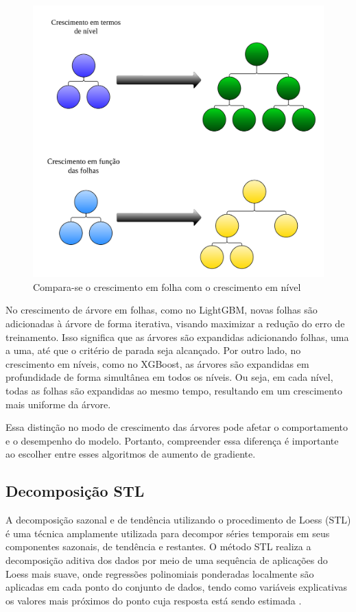 \begin{figure}[H]
	\centering
	\caption{Compara-se o crescimento em folha com o crescimento em nível}
	\label{fig:xgboost}
	\includegraphics[width=0.7\linewidth]{Modelos/Figuras/xgboost}
	
\end{figure}


No crescimento de árvore em folhas, como no LightGBM, novas folhas são adicionadas à árvore de forma iterativa, visando maximizar a redução do erro de treinamento. Isso significa que as árvores são expandidas adicionando folhas, uma a uma, até que o critério de parada seja alcançado.
Por outro lado, no crescimento em níveis, como no XGBoost, as árvores são expandidas em profundidade de forma simultânea em todos os níveis. Ou seja, em cada nível, todas as folhas são expandidas ao mesmo tempo, resultando em um crescimento mais uniforme da árvore.

Essa distinção no modo de crescimento das árvores pode afetar o comportamento e o desempenho do modelo. Portanto, compreender essa diferença é importante ao escolher entre esses algoritmos de aumento de gradiente.

\subsection{Decomposi\c c\~ao STL}

A decomposição sazonal e de tendência utilizando o procedimento de Loess (STL) é uma técnica amplamente utilizada para decompor séries temporais em seus componentes sazonais, de tendência e restantes. O método STL realiza a decomposição aditiva dos dados por meio de uma sequência de aplicações do Loess mais suave, onde regressões polinomiais ponderadas localmente são aplicadas em cada ponto do conjunto de dados, tendo como variáveis explicativas os valores mais próximos do ponto cuja resposta está sendo estimada \cite{Theodosiou20111178}.

